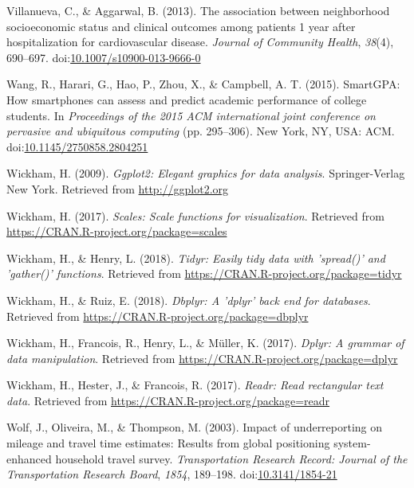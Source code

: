 \documentclass[man]{apa6}
\theoremstyle{definition}
\theoremstyle{definition}
\theoremstyle{definition}
\theoremstyle{remark}
\begin{document}
\hypertarget{ref-villanueva_association_2013}{}
Villanueva, C., \& Aggarwal, B. (2013). The association between
neighborhood socioeconomic status and clinical outcomes among patients 1
year after hospitalization for cardiovascular disease. \emph{Journal of
Community Health}, \emph{38}(4), 690--697.
doi:\href{https://doi.org/10.1007/s10900-013-9666-0}{10.1007/s10900-013-9666-0}

\hypertarget{ref-wang_smartgpa:_2015}{}
Wang, R., Harari, G., Hao, P., Zhou, X., \& Campbell, A. T. (2015).
SmartGPA: How smartphones can assess and predict academic performance of
college students. In \emph{Proceedings of the 2015 ACM international
joint conference on pervasive and ubiquitous computing} (pp. 295--306).
New York, NY, USA: ACM.
doi:\href{https://doi.org/10.1145/2750858.2804251}{10.1145/2750858.2804251}

\hypertarget{ref-R-ggplot2}{}
Wickham, H. (2009). \emph{Ggplot2: Elegant graphics for data analysis}.
Springer-Verlag New York. Retrieved from \url{http://ggplot2.org}

\hypertarget{ref-R-scales}{}
Wickham, H. (2017). \emph{Scales: Scale functions for visualization}.
Retrieved from \url{https://CRAN.R-project.org/package=scales}

\hypertarget{ref-R-tidyr}{}
Wickham, H., \& Henry, L. (2018). \emph{Tidyr: Easily tidy data with
'spread()' and 'gather()' functions}. Retrieved from
\url{https://CRAN.R-project.org/package=tidyr}

\hypertarget{ref-R-dbplyr}{}
Wickham, H., \& Ruiz, E. (2018). \emph{Dbplyr: A 'dplyr' back end for
databases}. Retrieved from
\url{https://CRAN.R-project.org/package=dbplyr}

\hypertarget{ref-R-dplyr}{}
Wickham, H., Francois, R., Henry, L., \& Müller, K. (2017). \emph{Dplyr:
A grammar of data manipulation}. Retrieved from
\url{https://CRAN.R-project.org/package=dplyr}

\hypertarget{ref-R-readr}{}
Wickham, H., Hester, J., \& Francois, R. (2017). \emph{Readr: Read
rectangular text data}. Retrieved from
\url{https://CRAN.R-project.org/package=readr}

\hypertarget{ref-wolf_impact_2003}{}
Wolf, J., Oliveira, M., \& Thompson, M. (2003). Impact of underreporting
on mileage and travel time estimates: Results from global positioning
system-enhanced household travel survey. \emph{Transportation Research
Record: Journal of the Transportation Research Board}, \emph{1854},
189--198. doi:\href{https://doi.org/10.3141/1854-21}{10.3141/1854-21}
\end{document}
